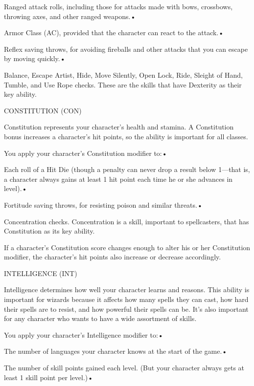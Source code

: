 \documentclass{article}
\begin{document}
\parindent=3pt
Ranged attack rolls, including those for attacks made with bows, crossbows, throwing 
axes, and other ranged weapons.• 

Armor Class (AC), provided that the character can react to the attack.• 

\parindent=7pt
Reflex saving throws, for avoiding fireballs and other attacks that you can escape 
by moving quickly.• 

\parindent=3pt
Balance, Escape Artist, Hide, Move Silently, Open Lock, Ride, Sleight of Hand, 
Tumble, and Use Rope checks. These are the skills that have Dexterity as their 
key ability.

\vspace{12pt}
\parindent=0pt
CONSTITUTION (CON)

Constitution represents your character's health and stamina. A Constitution bonus 
increases a character's hit points, so the ability is important for all classes.

You apply your character's Constitution modifier to:• 

\parindent=3pt
Each roll of a Hit Die (though a penalty can never drop a result below 1---that 
is, a character always gains at least 1 hit point each time he or she advances 
in level).• 

Fortitude saving throws, for resisting poison and similar threats.• 

\parindent=7pt
Concentration checks. Concentration is a skill, important to spellcasters, that 
has Constitution as its key ability.

\parindent=0pt
If a character's Constitution score changes enough to alter his or her Constitution 
modifier, the character's hit points also increase or decrease accordingly.

\vspace{12pt}
INTELLIGENCE (INT)

Intelligence determines how well your character learns and reasons. This ability 
is important for wizards because it affects how many spells they can cast, how 
hard their spells are to resist, and how powerful their spells can be. It's also 
important for any character who wants to have a wide assortment of skills.

You apply your character's Intelligence modifier to:• 

\parindent=3pt
The number of languages your character knows at the start of the game.• 

The number of skill points gained each level. (But your character always gets at 
least 1 skill point per level.)• 
\end{document}
